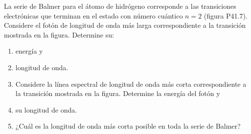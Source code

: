\item La serie de Balmer para el átomo de hidrógeno corresponde a las transiciones electrónicas que terminan en el estado con número cuántico $n = 2$ (figura P41.7). Considere el fotón de longitud de onda más larga correspondiente a la transición mostrada en la figura. Determine su:
\begin{enumerate}
    \item energía y
    \item longitud de onda.
    \item Considere la línea espectral de longitud de onda más corta correspondiente a la transición mostrada en la figura. Determine la energía del fotón y
    \item su longitud de onda.
    \item ¿Cuál es la longitud de onda más corta posible en toda la serie de Balmer?
\end{enumerate}
